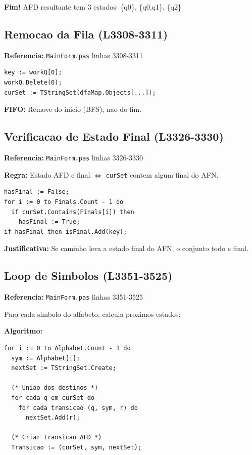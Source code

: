 \documentclass[12pt,a4paper]{article}
\begin{document}
\textbf{Fim!} AFD resultante tem 3 estados: \{q0\}, \{q0,q1\}, \{q2\}

\subsection{Remocao da Fila (L3308-3311)}

\textbf{Referencia:} \texttt{MainForm.pas} linhas 3308-3311

\begin{lstlisting}[style=pascal]
key := workQ[0];
workQ.Delete(0);
curSet := TStringSet(dfaMap.Objects[...]);
\end{lstlisting}

\textbf{FIFO:} Remove do inicio (BFS), nao do fim.

\subsection{Verificacao de Estado Final (L3326-3330)}

\textbf{Referencia:} \texttt{MainForm.pas} linhas 3326-3330

\textbf{Regra:} Estado AFD e final $\Leftrightarrow$ \texttt{curSet} contem algum final do AFN.

\begin{lstlisting}[style=pascal]
hasFinal := False;
for i := 0 to Finals.Count - 1 do
  if curSet.Contains(Finals[i]) then 
    hasFinal := True;
if hasFinal then isFinal.Add(key);
\end{lstlisting}

\textbf{Justificativa:} Se caminho leva a estado final do AFN, o conjunto todo e final.

\subsection{Loop de Simbolos (L3351-3525)}

\textbf{Referencia:} \texttt{MainForm.pas} linhas 3351-3525

Para cada simbolo do alfabeto, calcula proximos estados:

\textbf{Algoritmo:}
\begin{lstlisting}[style=pascal]
for i := 0 to Alphabet.Count - 1 do
  sym := Alphabet[i];
  nextSet := TStringSet.Create;
  
  (* Uniao dos destinos *)
  for cada q em curSet do
    for cada transicao (q, sym, r) do
      nextSet.Add(r);
  
  (* Criar transicao AFD *)
  Transicao := (curSet, sym, nextSet);
\end{lstlisting}
\end{document}
